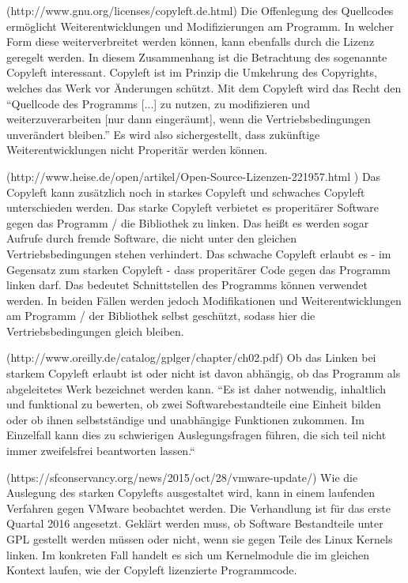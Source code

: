 (http://www.gnu.org/licenses/copyleft.de.html) Die Offenlegung des Quellcodes erm\"oglicht Weiterentwicklungen und Modifizierungen am Programm. In welcher Form diese weiterverbreitet werden k\"onnen, kann ebenfalls durch die Lizenz geregelt werden. In diesem Zusammenhang ist die Betrachtung des sogenannte Copyleft interessant. Copyleft ist im Prinzip die Umkehrung des Copyrights, welches das Werk vor \"Anderungen sch\"utzt. Mit dem Copyleft wird das Recht den “Quellcode des Programms [...] zu nutzen, zu modifizieren und weiterzuverarbeiten [nur dann einger\"aumt], wenn die Vertriebsbedingungen unver\"andert bleiben.” Es wird also sichergestellt, dass zuk\"unftige Weiterentwicklungen nicht Properit\"ar werden k\"onnen. 

(http://www.heise.de/open/artikel/Open-Source-Lizenzen-221957.html ) Das Copyleft kann zus\"atzlich noch in starkes Copyleft und schwaches Copyleft unterschieden werden. Das starke Copyleft verbietet es properit\"arer Software gegen das Programm / die Bibliothek zu linken. Das heißt es werden sogar Aufrufe durch fremde Software, die nicht unter den gleichen Vertriebsbedingungen stehen verhindert. Das schwache Copyleft erlaubt es - im Gegensatz zum starken Copyleft - dass properit\"arer Code gegen das Programm linken darf. Das bedeutet Schnittstellen des Programms k\"onnen verwendet werden. In beiden F\"allen werden jedoch Modifikationen und Weiterentwicklungen am Programm / der Bibliothek selbst gesch\"utzt, sodass hier die Vertriebsbedingungen gleich bleiben. 

(http://www.oreilly.de/catalog/gplger/chapter/ch02.pdf) Ob das Linken bei starkem Copyleft erlaubt ist oder nicht ist davon abh\"angig, ob das Programm als abgeleitetes Werk bezeichnet werden kann. “Es ist daher notwendig, inhaltlich und funktional zu bewerten, ob zwei Softwarebestandteile eine Einheit bilden oder ob ihnen selbstst\"andige und unabh\"angige Funktionen zukommen. Im Einzelfall kann dies zu schwierigen Auslegungsfragen f\"uhren, die sich teil nicht immer zweifelsfrei beantworten lassen.“

(https://sfconservancy.org/news/2015/oct/28/vmware-update/) Wie die Auslegung des starken Copylefts ausgestaltet wird, kann in einem laufenden Verfahren gegen VMware beobachtet werden. Die Verhandlung ist f\"ur das erste Quartal 2016 angesetzt. Gekl\"art werden muss, ob Software Bestandteile unter GPL gestellt werden m\"ussen oder nicht, wenn sie gegen Teile des Linux Kernels linken. Im konkreten Fall handelt es sich um Kernelmodule die im gleichen Kontext laufen, wie der Copyleft lizenzierte Programmcode.


